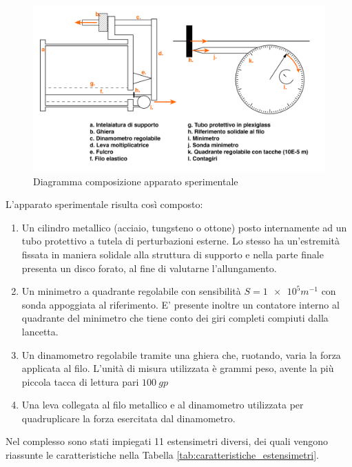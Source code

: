 \documentclass[a4paper,11pt,oneside]{article}
\begin{document}
\begin{figure}[h!]
    \centering
    \includegraphics[width=12.5cm]{ApparatoSperimentale.jpg}
    \caption{Diagramma composizione apparato sperimentale}
    \label{fig:apparato_sperimentale}
\end{figure}
L'apparato sperimentale risulta così composto:
\begin{enumerate}
    \item Un cilindro metallico (acciaio, tungsteno o ottone) posto internamente ad un tubo protettivo a tutela di perturbazioni esterne. Lo stesso ha un'estremità fissata in maniera solidale alla struttura di supporto e nella parte finale presenta un disco forato, al fine di valutarne l'allungamento.
    \item Un minimetro a quadrante regolabile con sensibilità $S=\num{1e5} \si{m^{-1}}$ con sonda appoggiata al riferimento. E' presente inoltre un contatore interno al quadrante del minimetro che tiene conto dei giri completi compiuti dalla lancetta.
    \item Un dinamometro regolabile tramite una ghiera che, ruotando, varia la forza applicata al filo. L'unità di misura utilizzata è grammi peso, avente la più piccola tacca di lettura pari $\SI{100}{gp}$
    \item Una leva collegata al filo metallico e al dinamometro utilizzata per quadruplicare la forza esercitata dal dinamometro.
\end{enumerate}
Nel complesso sono stati impiegati 11 estensimetri diversi, dei quali vengono riassunte le caratteristiche nella Tabella \ref{tab:caratteristiche_estensimetri}.
\end{document}
